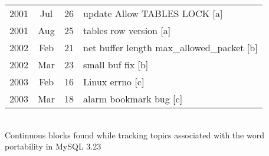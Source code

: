 \documentclass[titlepage,usenames,a4,landscape,semhelv]{seminar}
\begin{document}
\begin{slide}
\begin{itemize}
\begin{itemize}
\newslide

\begin{specquotef}
\centering
\begin{tabular}{|ccc|l|}

\hline
2001 &	Jul &	26 &		update Allow TABLES LOCK [a] \\ 

2001 &	Aug &	25 &		tables row version [a] \\
\hline
\hline
2002 &	Feb &	21 &		net buffer length	max\_allowed\_packet [b] \\
2002 &	Mar &	23 &		small buf fix [b]	\\
\hline
\hline
2003 &	Feb &	16 &		Linux errno	[c] \\
2003 &	Mar &	18 &		alarm bookmark bug [c] \\
\hline
\end{tabular} \\
{Continuous blocks found while tracking topics associated with the word portability in MySQL 3.23}
\label{tab:portability}
\end{specquotef}

\newslide



\end{itemize}
\end{itemize}
\end{slide}
\end{document}
